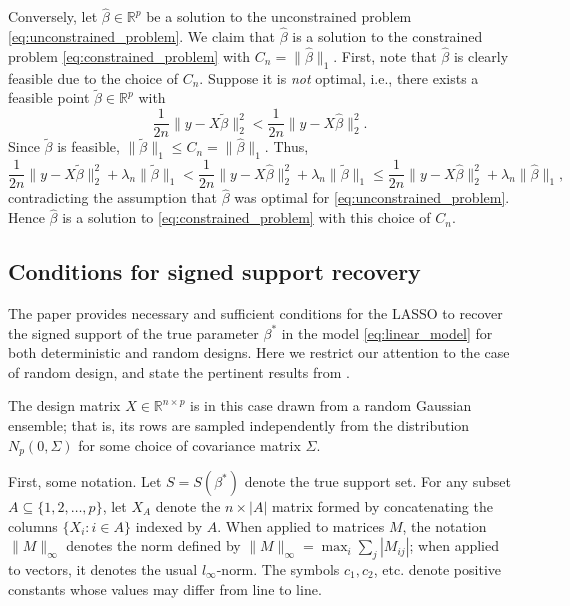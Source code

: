 \documentclass[letterpaper,12pt]{article}
\newcommand{\norm}[1]{\lVert#1\rVert}
\begin{document}
Conversely, let $\hat{\beta} \in \mathbb{R}^p$ be a solution to the
unconstrained problem \eqref{eq:unconstrained_problem}. We claim that
$\hat{\beta}$ is a solution to the constrained problem
\eqref{eq:constrained_problem} with $C_n =
\norm{\hat{\beta}}_1$. First, note that $\hat{\beta}$ is clearly
feasible due to the choice of $C_n$. Suppose it is \emph{not} optimal,
i.e., there exists a feasible point $\tilde{\beta} \in \mathbb{R}^p$
with
\begin{equation*}
  \frac{1}{2n} \norm{y - X\tilde{\beta}}_2^2
    < \frac{1}{2n} \norm{y - X\hat{\beta}}_2^2.
\end{equation*}
Since $\tilde{\beta}$ is feasible,
$\norm{\tilde{\beta}}_1 \leq C_n = \norm{\hat{\beta}}_1$. Thus,
\begin{equation*}
  \frac{1}{2n} \norm{y - X\tilde{\beta}}_2^2 + \lambda_n \norm{\tilde{\beta}}_1
    < \frac{1}{2n} \norm{y - X\hat{\beta}}_2^2
      + \lambda_n \norm{\tilde{\beta}}_1
    \leq \frac{1}{2n} \norm{y - X\hat{\beta}}_2^2
      + \lambda_n \norm{\hat{\beta}}_1,
\end{equation*}
contradicting the assumption that $\hat{\beta}$ was optimal for
\eqref{eq:unconstrained_problem}. Hence $\hat{\beta}$ is a solution to
\eqref{eq:constrained_problem} with this choice of $C_n$.

\subsection*{Conditions for signed support recovery}

The paper \cite{wainwright06} provides necessary and sufficient
conditions for the LASSO to recover the signed support of the true
parameter $\beta^\ast$ in the model \eqref{eq:linear_model} for both
deterministic and random designs. Here we restrict our attention to
the case of random design, and state the pertinent results from
\cite{wainwright06}.

The design matrix $X \in \mathbb{R}^{n \times p}$ is in this case
drawn from a random Gaussian ensemble; that is, its rows are sampled
independently from the distribution $N_p(0, \Sigma)$ for some choice
of covariance matrix $\Sigma$.

First, some notation. Let $S = S(\beta^\ast)$ denote the true support
set. For any subset $A \subseteq \{1, 2, \ldots, p\}$, let $X_A$
denote the $n \times |A|$ matrix formed by concatenating the columns
$\{X_i : i \in A\}$ indexed by $A$. When applied to matrices $M$, the
notation $\norm{M}_\infty$ denotes the norm defined by
$\norm{M}_\infty = \max_i \sum_j |M_{ij}|$; when applied to vectors,
it denotes the usual $l_\infty$-norm. The symbols $c_1, c_2$,
etc. denote positive constants whose values may differ from line to
line.
\end{document}
